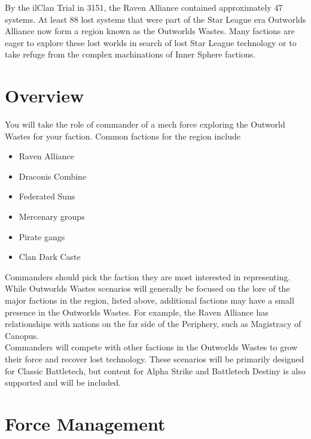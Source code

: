 \documentclass[UTF8]{article}
\begin{document}
By the ilClan Trial in 3151, the Raven Alliance contained approximately 47 systems.
At least 88 lost systems that were part of the Star League era Outworlds Alliance now form a region known as the Outworlds Wastes.
Many factions are eager to explore these lost worlds in search of lost Star League technology or to take refuge from the complex machinations of Inner Sphere factions.\\

\section{Overview}

You will take the role of commander of a mech force exploring the Outworld Wastes for your faction.
Common factions for the region include

\begin{itemize}

\item Raven Alliance

\item Draconis Combine

\item Federated Suns

\item Mercenary groups

\item Pirate gangs

\item Clan Dark Caste

\end{itemize}

Commanders should pick the faction they are most interested in representing.
While Outworlds Wastes scenarios will generally be focused on the lore of the major factions in the region, listed above, additional factions may have a small presence in the Outworlds Wastes.
For example, the Raven Alliance has relationships with nations on the far side of the Periphery, such as Magistracy of Canopus.\\

Commanders will compete with other factions in the Outworlds Wastes to grow their force and recover lost technology.
These scenarios will be primarily designed for Classic Battletech, but content for Alpha Strike and Battletech Destiny is also supported and will be included.

\newpage

\section{Force Management}
\end{document}
